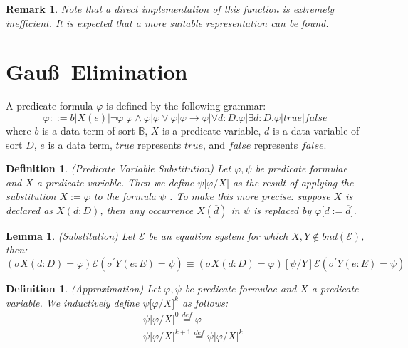 \documentclass{article}
\newtheorem{definition}[theorem]{Definition}
\newtheorem{lemma}[theorem]{Lemma}
\newtheorem{remark}[theorem]{Remark}
\begin{document}
\begin{remark}
Note that a direct implementation of this function is extremely inefficient.
It is expected that a more suitable representation can be found.
\end{remark}

\newpage 

\section{Gau\ss\ Elimination}

A predicate formula $\varphi $ is defined by the following grammar:%
\begin{equation*}
\varphi ::=b|X(e)|\lnot \varphi |\varphi \wedge \varphi |\varphi \vee
\varphi |\varphi \rightarrow \varphi |\forall d:D.\varphi |\exists
d:D.\varphi |true |false
\end{equation*}%
where $b$ is a data term of sort $\mathbb{B}$, $X$ is a predicate variable, $%
d$ is a data variable of sort $D$, $e$ is a data term, $true $ represents $%
true$, and $false $ represents $false$.

\begin{definition}
(Predicate Variable Substitution) Let $\varphi ,\psi $ be predicate formulae
and $X$ a predicate variable. Then we define $\psi \lbrack \varphi /X]$ as
the result of applying the substitution $X:=\varphi $ to the formula $\psi $%
. To make this more precise: suppose $X$ is declared as $X(d:D)$, then any
occurrence $X(\overline{d})$ in $\psi $ is replaced by $\varphi \lbrack d:=%
\overline{d}]$.
\end{definition}

\begin{lemma}
(Substitution) Let $\mathcal{E}$ be an equation system for which $X,Y\notin
bnd(\mathcal{E})$, then:%
\begin{equation*}
(\sigma X(d:D)=\varphi )\mathcal{E}(\sigma ^{\prime }Y(e:E)=\psi )\equiv
(\sigma X(d:D)=\varphi )[\psi /Y]\mathcal{E}(\sigma ^{\prime }Y(e:E)=\psi )
\end{equation*}
\end{lemma}

\begin{definition}
(Approximation) Let $\varphi ,\psi $ be predicate formulae and $X$ a
predicate variable. We inductively define $\psi \lbrack \varphi /X]^{k}$ as
follows:%
\begin{eqnarray*}
&&\psi \lbrack \varphi /X]^{0}\overset{def}{=}\varphi \\
&&\psi \lbrack \varphi /X]^{k+1}\overset{def}{=}\psi \lbrack \varphi /X]^{k}
\end{eqnarray*}
\end{definition}
\end{document}

